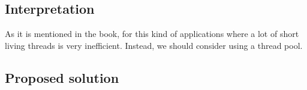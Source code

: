 \subsection{Interpretation}
\par
As it is mentioned in the book, for this kind of applications where a lot of
short living threads is very inefficient. Instead, we should consider using a
thread pool.
\par
\subsection{Proposed solution}
\par
\par
